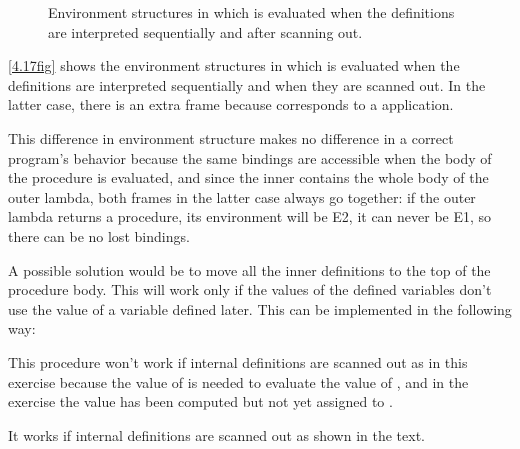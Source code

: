 \begin{exe}[4.17]
\begin{figure}
        \caption{Environment structures in which  is evaluated when 
        the definitions are interpreted sequentially and after scanning out.}
        \label{4.17fig}
    \end{figure}
    \autoref{4.17fig} shows the environment structures in which  is 
    evaluated when the definitions are interpreted sequentially and when they 
    are scanned out. In the latter case, there is an extra frame because 
     corresponds to a  application.

    This difference in environment structure makes no difference in a correct 
    program’s behavior because the same bindings are accessible when the body of 
    the procedure is evaluated, and since the inner  contains the 
    whole body of the outer lambda, both frames in the latter case always go 
    together: if the outer lambda returns a procedure, its environment will be 
    E2, it can never be E1, so there can be no lost bindings.

    A possible solution would be to move all the inner definitions to the top of 
    the procedure body. This will work only if the values of the defined 
    variables don’t use the value of a variable defined later. This can be 
    implemented in the following way:
\end{exe}

\begin{exe}[4.18]
    This procedure won’t work if internal definitions are scanned out as in this 
    exercise because the value of  is needed to evaluate the value of 
    , and in the exercise the value has been computed but not yet 
    assigned to .

    It works if internal definitions are scanned out as shown in the text.
\end{exe}

